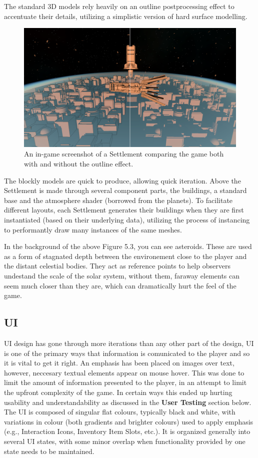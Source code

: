 \documentclass{report}
\begin{document}
The standard 3D models rely heavily on an outline postprocessing effect to accentuate their details, utilizing a simplistic version of hard surface modelling.

\begin{figure}[H]
	\centering
    \includegraphics[width=.9\textwidth]{outlineExample.png}
    \caption{An in-game screenshot of a Settlement comparing the game both with and without the outline effect.}
\end{figure}

The blockly models are quick to produce, allowing quick iteration. Above the Settlement is made through several component parts, the buildings, a standard base and the atmosphere shader (borrowed from the planets). To facilitate different layouts, each Settlement generates their buildings when they are first instantiated (based on their underlying data), utilizing the process of instancing to performantly draw many instances of the same meshes.

In the background of the above Figure 5.3, you can see asteroids. These are used as a form of stagnated depth between the environement close to the player and the distant celestial bodies. They act as reference points to help observers undestand the scale of the solar system, without them, faraway elements can seem much closer than they are, which can dramatically hurt the feel of the game.

\subsection{UI}

UI design has gone through more iterations than any other part of the design, UI is one of the primary ways that information is comunicated to the player and so it is vital to get it right. An emphasis has been placed on images over text, however, neccesary textual elements appear on mouse hover. This was done to limit the amount of information presented to the player, in an attempt to limit the upfront complexity of the game. In certain ways this ended up hurting usability and understandability as discussed in the \textbf{User Testing} section below. The UI is composed of singular flat colours, typically black and white, with variations in colour (both gradients and brighter colours) used to apply emphasis (e.g., Interaction Icons, Inventory Item Slots, etc.). It is organized generally into several UI states, with some minor overlap when functionality provided by one state needs to be maintained. 
\end{document}
